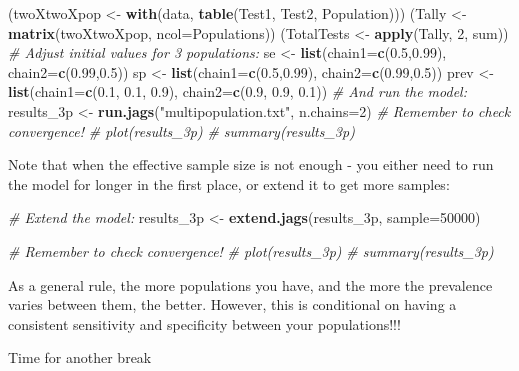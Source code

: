 \documentclass[
  ignorenonframetext,
]{beamer}
\newenvironment{Shaded}{\begin{snugshade}}{\end{snugshade}}
\newcommand{\AttributeTok}[1]{\textcolor[rgb]{0.13,0.29,0.53}{#1}}
\newcommand{\CommentTok}[1]{\textcolor[rgb]{0.56,0.35,0.01}{\textit{#1}}}
\newcommand{\DecValTok}[1]{\textcolor[rgb]{0.00,0.00,0.81}{#1}}
\newcommand{\FloatTok}[1]{\textcolor[rgb]{0.00,0.00,0.81}{#1}}
\newcommand{\FunctionTok}[1]{\textcolor[rgb]{0.13,0.29,0.53}{\textbf{#1}}}
\newcommand{\NormalTok}[1]{#1}
\newcommand{\OtherTok}[1]{\textcolor[rgb]{0.56,0.35,0.01}{#1}}
\newcommand{\StringTok}[1]{\textcolor[rgb]{0.31,0.60,0.02}{#1}}
\begin{document}
\begin{frame}[fragile]
\begin{Shaded}
\begin{Highlighting}[]
\NormalTok{(twoXtwoXpop }\OtherTok{\textless{}{-}} \FunctionTok{with}\NormalTok{(data, }\FunctionTok{table}\NormalTok{(Test1, Test2, Population)))}
\NormalTok{(Tally }\OtherTok{\textless{}{-}} \FunctionTok{matrix}\NormalTok{(twoXtwoXpop, }\AttributeTok{ncol=}\NormalTok{Populations))}
\NormalTok{(TotalTests }\OtherTok{\textless{}{-}} \FunctionTok{apply}\NormalTok{(Tally, }\DecValTok{2}\NormalTok{, sum))}
\CommentTok{\# Adjust initial values for 3 populations:}
\NormalTok{se }\OtherTok{\textless{}{-}} \FunctionTok{list}\NormalTok{(}\AttributeTok{chain1=}\FunctionTok{c}\NormalTok{(}\FloatTok{0.5}\NormalTok{,}\FloatTok{0.99}\NormalTok{), }\AttributeTok{chain2=}\FunctionTok{c}\NormalTok{(}\FloatTok{0.99}\NormalTok{,}\FloatTok{0.5}\NormalTok{))}
\NormalTok{sp }\OtherTok{\textless{}{-}} \FunctionTok{list}\NormalTok{(}\AttributeTok{chain1=}\FunctionTok{c}\NormalTok{(}\FloatTok{0.5}\NormalTok{,}\FloatTok{0.99}\NormalTok{), }\AttributeTok{chain2=}\FunctionTok{c}\NormalTok{(}\FloatTok{0.99}\NormalTok{,}\FloatTok{0.5}\NormalTok{))}
\NormalTok{prev }\OtherTok{\textless{}{-}} \FunctionTok{list}\NormalTok{(}\AttributeTok{chain1=}\FunctionTok{c}\NormalTok{(}\FloatTok{0.1}\NormalTok{, }\FloatTok{0.1}\NormalTok{, }\FloatTok{0.9}\NormalTok{), }\AttributeTok{chain2=}\FunctionTok{c}\NormalTok{(}\FloatTok{0.9}\NormalTok{, }\FloatTok{0.9}\NormalTok{, }\FloatTok{0.1}\NormalTok{))}
\CommentTok{\# And run the model:}
\NormalTok{results\_3p }\OtherTok{\textless{}{-}} \FunctionTok{run.jags}\NormalTok{(}\StringTok{"multipopulation.txt"}\NormalTok{, }\AttributeTok{n.chains=}\DecValTok{2}\NormalTok{)}
\CommentTok{\# Remember to check convergence!}
\CommentTok{\# plot(results\_3p)}
\CommentTok{\# summary(results\_3p)}
\end{Highlighting}
\end{Shaded}

\normalsize
\end{frame}

\begin{frame}[fragile]
Note that when the effective sample size is not enough - you either need
to run the model for longer in the first place, or extend it to get more
samples:

\scriptsize

\begin{Shaded}
\begin{Highlighting}[]
\CommentTok{\# Extend the model:}
\NormalTok{results\_3p }\OtherTok{\textless{}{-}} \FunctionTok{extend.jags}\NormalTok{(results\_3p, }\AttributeTok{sample=}\DecValTok{50000}\NormalTok{)}

\CommentTok{\# Remember to check convergence!}
\CommentTok{\# plot(results\_3p)}
\CommentTok{\# summary(results\_3p)}
\end{Highlighting}
\end{Shaded}

\normalsize
\end{frame}

\begin{frame}
As a general rule, the more populations you have, and the more the
prevalence varies between them, the better. However, this is conditional
on having a consistent sensitivity and specificity between your
populations!!!
\end{frame}

\begin{frame}
Time for another break
\end{frame}
\end{document}
